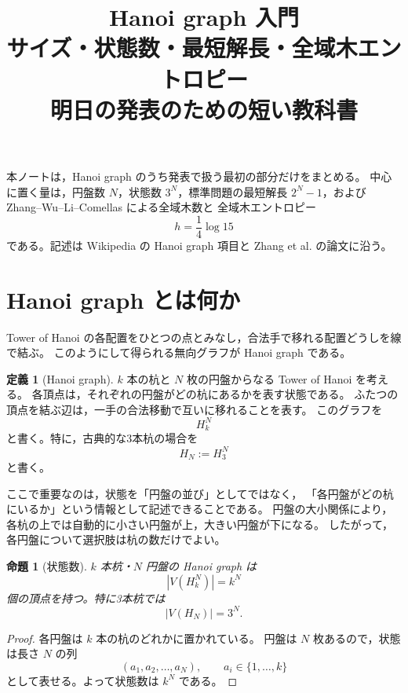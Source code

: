 \documentclass[a4paper,11pt]{ltjsarticle}
\title{\vspace{-1.2cm}
{\Large\color{accent}Hanoi graph 入門}\\[0.4em]
{\huge サイズ・状態数・最短解長・全域木エントロピー}\\[0.4em]
{\large 明日の発表のための短い教科書}}
\author{}
\date{}
\theoremstyle{definition}
\newtheorem{definition}{定義}[section]
\theoremstyle{plain}
\newtheorem{proposition}{命題}[section]
\theoremstyle{remark}
\newcommand{\HN}{H_N}
\begin{document}
\color{ink}
\maketitle
\vspace{-1.0cm}

\begin{center}
\begin{minipage}{0.86\linewidth}
\small
本ノートは，Hanoi graph のうち発表で扱う最初の部分だけをまとめる。
中心に置く量は，円盤数 \(N\)，状態数 \(3^N\)，標準問題の最短解長
\(2^N-1\)，および Zhang--Wu--Li--Comellas による全域木数と
全域木エントロピー
\[
  h=\frac{1}{4}\log 15
\]
である。記述は Wikipedia の Hanoi graph 項目と
Zhang et al. の論文に沿う。
\end{minipage}
\end{center}

\section{Hanoi graph とは何か}

Tower of Hanoi の各配置をひとつの点とみなし，合法手で移れる配置どうしを線で結ぶ。
このようにして得られる無向グラフが Hanoi graph である。

\begin{definition}[Hanoi graph]
\(k\) 本の杭と \(N\) 枚の円盤からなる Tower of Hanoi を考える。
各頂点は，それぞれの円盤がどの杭にあるかを表す状態である。
ふたつの頂点を結ぶ辺は，一手の合法移動で互いに移れることを表す。
このグラフを
\[
  H_k^N
\]
と書く。特に，古典的な3本杭の場合を
\[
  \HN := H_3^N
\]
と書く。
\end{definition}

ここで重要なのは，状態を「円盤の並び」としてではなく，
「各円盤がどの杭にいるか」という情報として記述できることである。
円盤の大小関係により，各杭の上では自動的に小さい円盤が上，大きい円盤が下になる。
したがって，各円盤について選択肢は杭の数だけでよい。

\begin{proposition}[状態数]
\(k\) 本杭・\(N\) 円盤の Hanoi graph は
\[
  |V(H_k^N)|=k^N
\]
個の頂点を持つ。特に3本杭では
\[
  |V(\HN)|=3^N.
\]
\end{proposition}

\begin{proof}
各円盤は \(k\) 本の杭のどれかに置かれている。
円盤は \(N\) 枚あるので，状態は長さ \(N\) の列
\[
  (a_1,a_2,\ldots,a_N), \qquad a_i\in\{1,\ldots,k\}
\]
として表せる。よって状態数は \(k^N\) である。
\end{proof}
\end{document}
